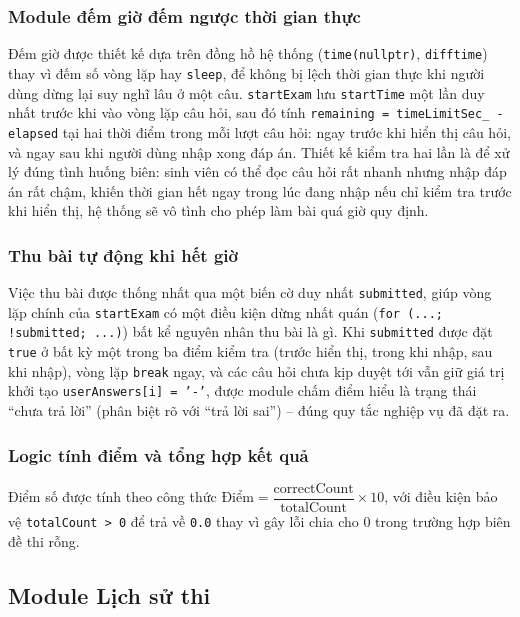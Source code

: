 \documentclass[11pt]{report}
\begin{document}
\subsubsection{Module đếm giờ đếm ngược thời gian thực}

Đếm giờ được thiết kế dựa trên đồng hồ hệ thống (\texttt{time(nullptr)}, \texttt{difftime}) thay vì đếm số vòng lặp hay \texttt{sleep}, để không bị lệch thời gian thực khi người dùng dừng lại suy nghĩ lâu ở một câu. \texttt{startExam} lưu \texttt{startTime} một lần duy nhất trước khi vào vòng lặp câu hỏi, sau đó tính \texttt{remaining = timeLimitSec\_ - elapsed} tại hai thời điểm trong mỗi lượt câu hỏi: ngay trước khi hiển thị câu hỏi, và ngay sau khi người dùng nhập xong đáp án. Thiết kế kiểm tra hai lần là để xử lý đúng tình huống biên: sinh viên có thể đọc câu hỏi rất nhanh nhưng nhập đáp án rất chậm, khiến thời gian hết ngay trong lúc đang nhập nếu chỉ kiểm tra trước khi hiển thị, hệ thống sẽ vô tình cho phép làm bài quá giờ quy định.

\subsubsection{Thu bài tự động khi hết giờ}

Việc thu bài được thống nhất qua một biến cờ duy nhất \texttt{submitted}, giúp vòng lặp chính của \texttt{startExam} có một điều kiện dừng nhất quán (\texttt{for (...; !submitted; ...)}) bất kể nguyên nhân thu bài là gì. Khi \texttt{submitted} được đặt \texttt{true} ở bất kỳ một trong ba điểm kiểm tra (trước hiển thị, trong khi nhập, sau khi nhập), vòng lặp \texttt{break} ngay, và các câu hỏi chưa kịp duyệt tới vẫn giữ giá trị khởi tạo \texttt{userAnswers[i] = '-'}, được module chấm điểm hiểu là trạng thái ``chưa trả lời'' (phân biệt rõ với ``trả lời sai'') -- đúng quy tắc nghiệp vụ đã đặt ra.

\subsubsection{Logic tính điểm và tổng hợp kết quả}

Điểm số được tính theo công thức $\text{Điểm} = \dfrac{\text{correctCount}}{\text{totalCount}} \times 10$, với điều kiện bảo vệ \texttt{totalCount > 0} để trả về \texttt{0.0} thay vì gây lỗi chia cho 0 trong trường hợp biên đề thi rỗng. 

\subsection{Module Lịch sử thi}
\end{document}
